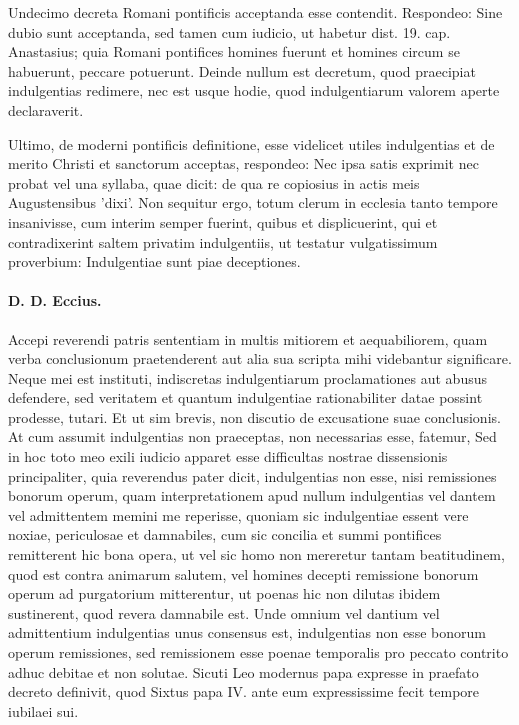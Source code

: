 Undecimo decreta Romani pontificis acceptanda esse contendit. Respondeo: Sine dubio sunt acceptanda, sed tamen cum iudicio, ut habetur dist. 19. cap. Anastasius; quia Romani pontifices homines fuerunt et homines circum se habuerunt, peccare potuerunt. Deinde nullum est decretum, quod praecipiat indulgentias redimere, nec est usque hodie, quod indulgentiarum valorem aperte declaraverit.

Ultimo, de moderni pontificis definitione, esse videlicet utiles indulgentias et de merito Christi et sanctorum acceptas, respondeo: Nec ipsa satis exprimit nec probat vel una syllaba, quae dicit: de qua re copiosius in actis meis Augustensibus 'dixi'. Non sequitur ergo, totum clerum in ecclesia tanto tempore insanivisse, cum interim semper fuerint, quibus et displicuerint, qui et contradixerint saltem privatim indulgentiis, ut testatur vulgatissimum proverbium: Indulgentiae sunt piae deceptiones.

\paragraph*{D. D. Eccius.}

Accepi reverendi patris sententiam in multis mitiorem et aequabiliorem, quam verba conclusionum praetenderent aut alia sua scripta mihi videbantur significare. Neque mei est instituti, indiscretas indulgentiarum proclamationes aut abusus defendere, sed veritatem et quantum indulgentiae rationabiliter datae possint prodesse, tutari. Et ut sim brevis, non discutio de excusatione suae conclusionis. At cum assumit indulgentias non praeceptas, non necessarias esse, fatemur, Sed in hoc toto meo exili iudicio apparet esse difficultas nostrae dissensionis principaliter, quia reverendus pater dicit, indulgentias non esse, nisi remissiones bonorum operum, quam interpretationem apud nullum indulgentias vel dantem vel admittentem memini me reperisse, quoniam sic indulgentiae essent vere noxiae, periculosae et damnabiles, cum sic concilia et summi pontifices remitterent hic bona opera, ut vel sic homo non mereretur tantam beatitudinem, quod est contra animarum salutem, vel homines decepti remissione bonorum operum ad purgatorium mitterentur, ut poenas hic non dilutas ibidem sustinerent, quod revera damnabile est. Unde omnium vel dantium vel admittentium indulgentias unus consensus est, indulgentias non esse bonorum operum remissiones, sed remissionem esse poenae temporalis pro peccato contrito adhuc debitae et non solutae. Sicuti Leo modernus papa expresse in praefato decreto definivit, quod Sixtus papa IV. ante eum expressissime fecit tempore iubilaei sui.

